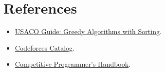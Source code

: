 \section*{References}

\begin{itemize}
  \item \href{https://usaco.guide/silver/greedy-sorting}{USACO Guide: Greedy Algorithms with Sorting}.
  \item \href{https://codeforces.com/catalog}{Codeforces Catalog}.
  \item \href{https://usaco.guide/CPH.pdf}{Competitive Programmer's Handbook}.
\end{itemize}
